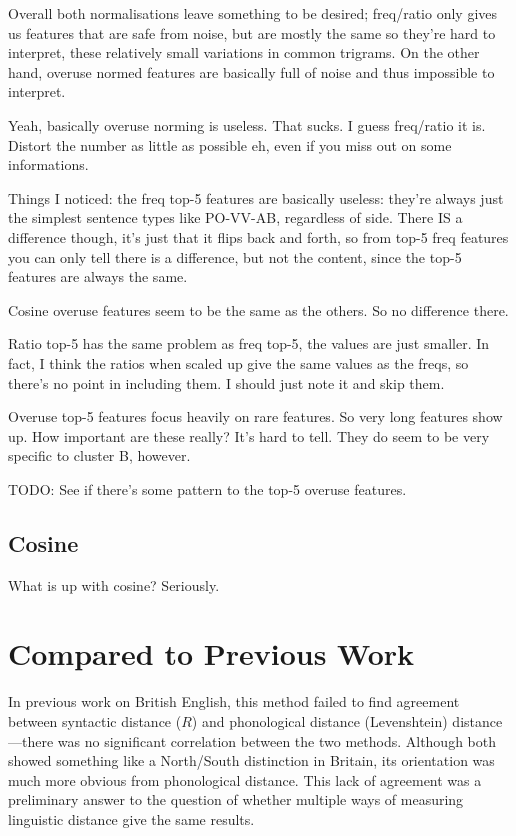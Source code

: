 Overall both normalisations leave something to be desired; freq/ratio
only gives us features that are safe from noise, but are mostly the
same so they're hard to interpret, these relatively small variations
in common trigrams. On the other hand, overuse normed features are
basically full of noise and thus impossible to interpret.

Yeah, basically overuse norming is useless. That sucks. I guess
freq/ratio it is. Distort the number as little as possible eh, even if
you miss out on some informations.

Things I noticed: the freq top-5 features are basically useless:
they're always just the simplest sentence types like PO-VV-AB,
regardless of side. There IS a difference though, it's just that it
flips back and forth, so from top-5 freq features you can only tell there is
a difference, but not the content, since the top-5 features are always
the same.

Cosine overuse features seem to be the same as the others. So no
difference there.

Ratio top-5 has the same problem as freq top-5, the values are just
smaller. In fact, I think the ratios when scaled up give the same
values as the freqs, so there's no point in including them. I should
just note it and skip them.

Overuse top-5 features focus heavily on rare features. So very long
features show up. How important are these really? It's hard to
tell. They do seem to be very specific to cluster B, however.

TODO: See if there's some pattern to the top-5 overuse features.

\subsection{Cosine}

What is up with cosine? Seriously.

\section{Compared to Previous Work}

In previous work on British English, this method failed to find
agreement between syntactic distance ($R$) and phonological distance
(Levenshtein) distance---there was no
significant correlation between the two methods. Although both showed
something like a North/South distinction in Britain, its orientation was much more
obvious from phonological distance. This lack of agreement was a
preliminary answer to the question of whether multiple
ways of measuring linguistic distance give the same results.

